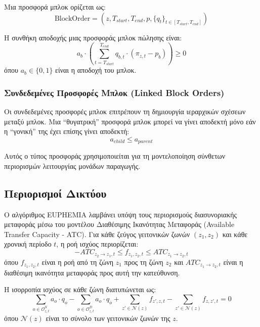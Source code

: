 Μια προσφορά μπλοκ ορίζεται ως:
\begin{equation}
\label{eq:block-order}
\text{BlockOrder} = (z, T_{start}, T_{end}, p, \{q_t\}_{t \in [T_{start}, T_{end}]})
\end{equation}

Η συνθήκη αποδοχής μιας προσφοράς μπλοκ πώλησης είναι:
\begin{equation}
\label{eq:block-acceptance-condition}
a_b \cdot \left( \sum_{t=T_{start}}^{T_{end}} q_{b,t} \cdot (\pi_{z,t} - p_b) \right) \geq 0
\end{equation}
όπου $a_b \in \{0, 1\}$ είναι η αποδοχή του μπλοκ.

\subsubsection{Συνδεδεμένες Προσφορές Μπλοκ (Linked Block Orders)}

Οι συνδεδεμένες προσφορές μπλοκ επιτρέπουν τη δημιουργία ιεραρχικών σχέσεων μεταξύ μπλοκ. Μια ``θυγατρική'' προσφορά μπλοκ μπορεί να γίνει αποδεκτή μόνο εάν η ``γονική'' της έχει επίσης γίνει αποδεκτή:
\begin{equation}
\label{eq:linked-block}
a_{child} \leq a_{parent}
\end{equation}

Αυτός ο τύπος προσφοράς χρησιμοποιείται για τη μοντελοποίηση σύνθετων περιορισμών λειτουργίας μονάδων παραγωγής.

\subsection{Περιορισμοί Δικτύου}
\label{subsec:euphemia-network}

Ο αλγόριθμος EUPHEMIA λαμβάνει υπόψη τους περιορισμούς διασυνοριακής μεταφοράς μέσω του μοντέλου Διαθέσιμης Ικανότητας Μεταφοράς (Available Transfer Capacity - ATC). Για κάθε ζεύγος γειτονικών ζωνών $(z_1, z_2)$ και κάθε χρονική περίοδο $t$, η ροή ισχύος περιορίζεται:
\begin{equation}
\label{eq:atc-constraint}
-ATC_{z_2 \rightarrow z_1, t} \leq f_{z_1, z_2, t} \leq ATC_{z_1 \rightarrow z_2, t}
\end{equation}
όπου $f_{z_1, z_2, t}$ είναι η ροή από τη ζώνη $z_1$ προς τη ζώνη $z_2$ και $ATC_{z_1 \rightarrow z_2, t}$ είναι η διαθέσιμη ικανότητα μεταφοράς προς αυτή την κατεύθυνση.

Η ισορροπία ισχύος σε κάθε ζώνη διατυπώνεται ως:
\begin{equation}
\label{eq:zonal-balance}
\sum_{o \in \mathcal{O}_{z,t}^S} a_o \cdot q_o - \sum_{o \in \mathcal{O}_{z,t}^D} a_o \cdot q_o + \sum_{z' \in \mathcal{N}(z)} f_{z', z, t} - \sum_{z' \in \mathcal{N}(z)} f_{z, z', t} = 0
\end{equation}
όπου $\mathcal{N}(z)$ είναι το σύνολο των γειτονικών ζωνών της $z$.

